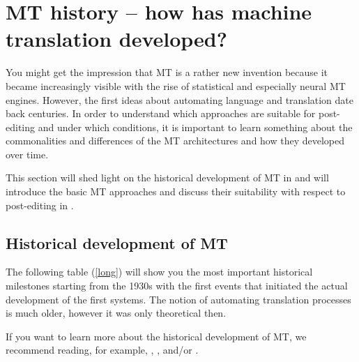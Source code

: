 \chapter{MT history -- how has machine translation developed?}\label{sec:3}


\vspace{\baselineskip}

You might get the impression that MT is a rather new invention because it became increasingly visible with the rise of statistical and especially neural MT engines. However, the first ideas about automating language and translation date back centuries. In order to understand which approaches are suitable for post-editing and under which conditions, it is important to learn something about the commonalities and differences of the MT architectures and how they developed over time. 

This section will shed light on the historical development of MT in  and will introduce the basic MT approaches and discuss their suitability with respect to post-editing in .

\section{Historical development of MT}\label{sec:3:1}

The following table (\ref{long}) will show you the most important historical milestones starting from the 1930s with the first events that initiated the actual development of the first systems. The notion of automating translation processes is much older, however it was only theoretical then.

If you want to learn more about the historical development of MT, we recommend reading, for example, \citet{hutchins2000early}, \citet{hutchins2007machine}, and/or \citet{schwartz2018history}.

